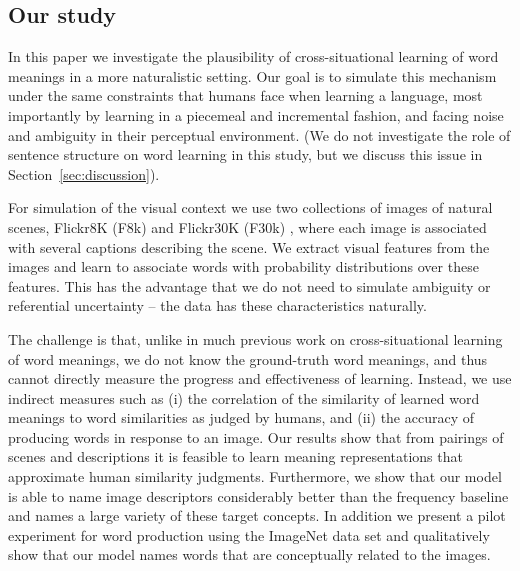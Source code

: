 \subsection{Our study}
\label{sec:out-study}

In this paper we investigate the plausibility of cross-situational
learning of word meanings in a more naturalistic setting. Our goal is
to simulate this mechanism under the same constraints that humans face
when learning a language, most importantly by learning in a piecemeal
and incremental fashion, and facing noise and ambiguity in their
perceptual environment. (We do not investigate the role of sentence structure on word learning in this study, but we discuss this issue in Section~\ref{sec:discussion}).
\label{why-incremental}

For simulation of the visual context we use two collections of images
of natural scenes, Flickr8K (F8k) \cite{rashtchian2010collecting} and
Flickr30K (F30k) \cite{young2014image}, where each image is associated with
several captions describing the scene. We extract visual features from
the images and learn to associate words with probability distributions
over these features. This has the advantage that we do not need to
simulate ambiguity or referential uncertainty -- the data has these
characteristics naturally.

The challenge is that, unlike in much previous work on
cross-situational learning of word meanings, we do not know the
ground-truth word meanings, and thus cannot directly measure the
progress and effectiveness of learning. Instead, we use indirect
measures such as (i) the correlation of the similarity of learned word
meanings to word similarities as judged by humans, and (ii) the
accuracy of producing words in response to an image. Our results show
that from pairings of scenes and descriptions it is feasible to learn
meaning representations that approximate human similarity
judgments. Furthermore, we show that our model is able to name image
descriptors considerably better than the frequency baseline and names
a large variety of these target concepts. In addition we present a
pilot experiment for word production using the ImageNet data set and
qualitatively show that our model names words that are conceptually
related to the images.
